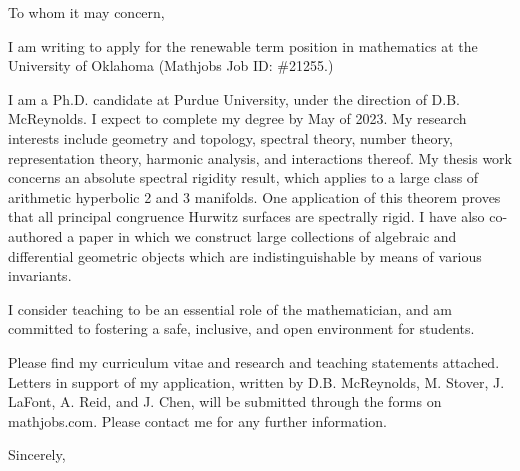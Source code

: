 \documentclass[a4paper,oneside,10pt]{letter}
\date{}
\makeatletter
\renewcommand{\closing}[1]{\par\nobreak\vspace{\parskip}%
	\stopbreaks
	\noindent
	\ifx\@empty\fromaddress\else
	\hspace*{\longindentation}\fi
	\parbox{\indentedwidth}{\raggedright
		\ignorespaces #1\\[2\medskipamount]%
		\ifx\@empty\fromsig
		\fromname
		\else \fromsig \fi\strut}%
	\par}
\makeatother
\begin{document}
	\begin{letter}{}
		
		\opening{To whom it may concern,} %
		I am writing to apply for the renewable term position in mathematics at the University of Oklahoma (Mathjobs Job ID: \#21255.)
		
		I am a Ph.D. candidate at Purdue University, under the direction of D.B. McReynolds. I expect to complete my degree by May of 2023. My research interests include geometry and topology, spectral theory, number theory, representation theory, harmonic analysis, and interactions thereof. My thesis work concerns an absolute spectral rigidity result, which applies to a large class of arithmetic hyperbolic 2 and 3 manifolds.  One application of this theorem proves that all principal congruence Hurwitz surfaces are spectrally rigid. I have also co-authored a paper in which we construct large collections of algebraic and differential geometric objects which are indistinguishable by means of various invariants.
		
		I consider teaching to be an essential role of the mathematician, and am committed to fostering a safe, inclusive, and open environment for students. 
		
		Please find my curriculum vitae and research and teaching statements attached. Letters in support of my application, written by D.B. McReynolds, M. Stover, J. LaFont, A. Reid, and J. Chen, will be submitted through the forms on mathjobs.com.  Please contact me for any further information. 
		
		
		
		\closing{Sincerely,} %
		
		
	\end{letter}
\end{document}
